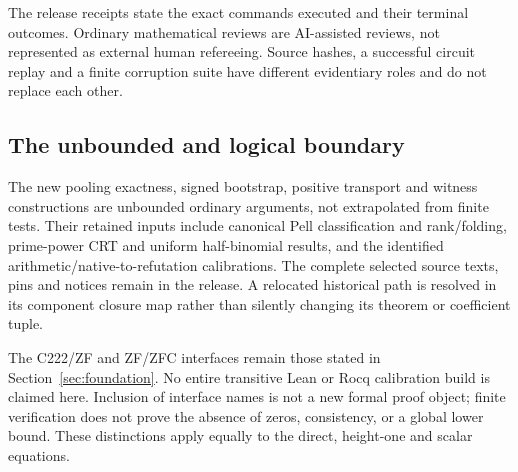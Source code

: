 The release receipts state the exact commands executed and their
terminal outcomes. Ordinary mathematical reviews are AI-assisted reviews,
not represented as external human refereeing. Source hashes, a successful
circuit replay and a finite corruption suite have different evidentiary
roles and do not replace each other.

\subsection{The unbounded and logical boundary}
The new pooling exactness, signed bootstrap, positive transport and
witness constructions are unbounded ordinary arguments, not extrapolated
from finite tests. Their retained inputs include canonical Pell
classification and rank/folding, prime-power CRT and uniform
half-binomial results, and the identified arithmetic/native-to-refutation
calibrations. The complete selected source texts, pins and notices remain
in the release. A relocated historical path is resolved in its component
closure map rather than silently changing its theorem or coefficient tuple.

The C222/ZF and ZF/ZFC interfaces remain those stated in
Section~\ref{sec:foundation}. No entire transitive Lean or Rocq
calibration build is claimed here. Inclusion of interface names is not
a new formal proof object; finite verification does not prove the absence
of zeros, consistency, or a global lower bound. These distinctions apply
equally to the direct, height-one and scalar equations.
